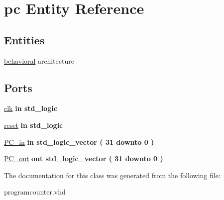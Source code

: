 \hypertarget{classpc}{\section{pc \-Entity \-Reference}
\label{classpc}
}
\subsection*{\-Entities}
\begin{DoxyCompactItemize}
\item 
\hyperlink{classpc_1_1behavioral}{behavioral} architecture
\end{DoxyCompactItemize}
\*
\*
\subsection*{\-Ports}
 \begin{DoxyCompactItemize}
\item 
\hypertarget{classpc_a66122f468837e0c758d57582b68eb123}{\hyperlink{classpc_a66122f468837e0c758d57582b68eb123}{clk}  {\bfseries {\bfseries in }} {\bfseries std\-\_\-logic } }\label{classpc_a66122f468837e0c758d57582b68eb123}

\item 
\hypertarget{classpc_ab46b7d3d37e6c21a29a6f2a207682d72}{\hyperlink{classpc_ab46b7d3d37e6c21a29a6f2a207682d72}{reset}  {\bfseries {\bfseries in }} {\bfseries std\-\_\-logic } }\label{classpc_ab46b7d3d37e6c21a29a6f2a207682d72}

\item 
\hypertarget{classpc_add4c01f1cc397a05cf5ad7aa3b694cea}{\hyperlink{classpc_add4c01f1cc397a05cf5ad7aa3b694cea}{\-P\-C\-\_\-in}  {\bfseries {\bfseries in }} {\bfseries std\-\_\-logic\-\_\-vector (   31    downto    0  ) } }\label{classpc_add4c01f1cc397a05cf5ad7aa3b694cea}

\item 
\hypertarget{classpc_ad400ac7e764014280c356d0bc1034caa}{\hyperlink{classpc_ad400ac7e764014280c356d0bc1034caa}{\-P\-C\-\_\-out}  {\bfseries {\bfseries out }} {\bfseries std\-\_\-logic\-\_\-vector (   31    downto    0  ) } }\label{classpc_ad400ac7e764014280c356d0bc1034caa}

\end{DoxyCompactItemize}


\-The documentation for this class was generated from the following file\-:\begin{DoxyCompactItemize}
\item 
programcounter.\-vhd\end{DoxyCompactItemize}
